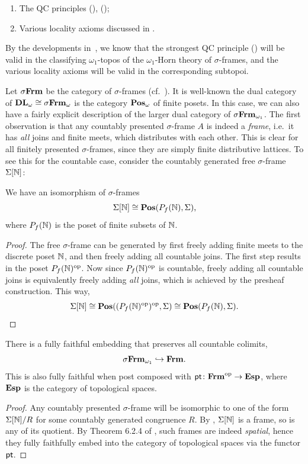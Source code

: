 \begin{enumerate}
  \item The \gls{QC} principles (\AxiomSQCF), (\AxiomSQCC);
  \item Various locality axioms discussed in .
\end{enumerate}

By the developments in~, we know that the strongest \gls{QC} principle (\AxiomSQCC) will be valid in the classifying $\omega_1$-topos of the $\omega_1$-Horn theory of $\sigma$-frames, and the various locality axioms will be valid in the corresponding subtopoi.

Let $\sigma\mathbf{Frm}$ be the category of $\sigma$-frames (cf.~). It is well-known the dual category of $\mathbf{DL}_\omega \cong \sigma\mathbf{Frm}_\omega$ is the category $\mathbf{Pos}_\omega$ of finite posets. In this case, we can also have a fairly explicit description of the larger dual category of $\sigma\mathbf{Frm}_{\omega_1}$. The first observation is that any countably presented $\sigma$-frame $A$ is indeed a \emph{frame}, i.e.\ it has \emph{all} joins and finite meets, which distributes with each other. This is clear for all finitely presented $\sigma$-frames, since they are simply finite distributive lattices. To see this for the countable case, consider the countably generated free $\sigma$-frame $\Sigma[\mathbb{N}]$:

\begin{lemma}\label{lem:cgfreesframe}
  We have an isomorphism of $\sigma$-frames
  \[ \Sigma[\mathbb{N}] \cong \mathbf{Pos}(P_f(\mathbb{N}),\Sigma)\text{,} \]
  where $P_f(\mathbb{N})$ is the poset of finite subsets of $\mathbb{N}$.
\end{lemma}
\begin{proof}
  The free $\sigma$-frame can be generated by first freely adding finite meets to the discrete poset $\mathbb{N}$, and then freely adding all countable joins. The first step results in the poset $P_f(\mathbb{N})^{\mathrm{op}}$. Now since $P_f(\mathbb{N})^{\mathrm{op}}$ is countable, freely adding all countable joins is equivalently freely adding \emph{all} joins, which is achieved by the presheaf construction. This way,
  \[ \Sigma[\mathbb{N}] \cong \mathbf{Pos}((P_f(\mathbb{N})^{\mathrm{op}})^{\mathrm{op}},\Sigma) \cong \mathbf{Pos}(P_f(\mathbb{N}),\Sigma). \qedhere \]
\end{proof}

\begin{corollary}\label{cor:dualsframe}
  There is a fully faithful embedding that preserves all countable colimits,
  \[ \sigma\mathbf{Frm}_{\omega_1} \hookrightarrow \mathbf{Frm}\text{.} \]
  This is also fully faithful when post composed with $\mathsf{pt} \colon \mathbf{Frm}^{\mathrm{op}} \to \mathbf{Esp}$, where $\mathbf{Esp}$ is the category of topological spaces.
\end{corollary}
\begin{proof}
  Any countably presented $\sigma$-frame will be isomorphic to one of the form $\Sigma[\mathbb{N}]/R$ for some countably generated congruence $R$. By , $\Sigma[\mathbb{N}]$ is a frame, so is any of its quotient. By Theorem 6.2.4 of \citet{makkai1977first}, such frames are indeed \emph{spatial}, hence they fully faithfully embed into the category of topological spaces via the functor $\mathsf{pt}$.
\end{proof}

